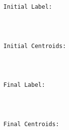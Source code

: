 \documentclass[11pt]{article}
\begin{document}
    \begin{Verbatim}[commandchars=\\\{\}]

Initial Label:

    \end{Verbatim}

    \begin{center}
    \end{center}
    { \hspace*{\fill} \\}
    
    \begin{Verbatim}[commandchars=\\\{\}]

Initial Centroids:

    \end{Verbatim}

    \begin{center}
    \end{center}
    { \hspace*{\fill} \\}
    
    \begin{Verbatim}[commandchars=\\\{\}]

Final Label:

    \end{Verbatim}

    \begin{center}
    \end{center}
    { \hspace*{\fill} \\}
    
    \begin{Verbatim}[commandchars=\\\{\}]

Final Centroids:

    \end{Verbatim}

    \begin{center}
    \end{center}
    { \hspace*{\fill} \\}
    
\end{document}

